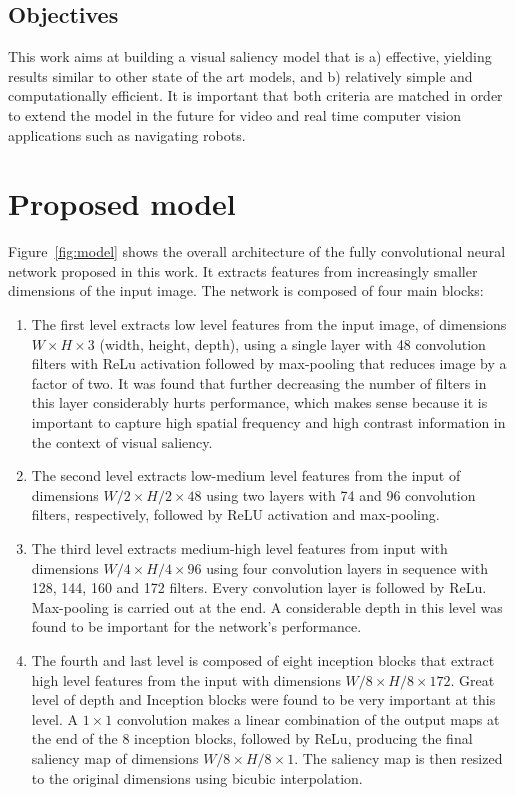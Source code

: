 \documentclass[10pt,twocolumn,letterpaper]{article}
\begin{document}
\subsection{Objectives}
This work aims at building a visual saliency model that is a) effective,
yielding results similar to other state of the art models,
and b) relatively simple and computationally efficient.
It is important that both criteria are matched in order to extend the
model in the future for video and real time computer vision applications
such as navigating robots.

\section{Proposed model}
Figure~\ref{fig:model} shows the overall architecture of the fully
convolutional neural network proposed in this work.
It extracts features from increasingly smaller dimensions of the
input image.
The network is composed of four main blocks:

\begin{enumerate}
    \item The first level extracts low level features from the input image, of
        dimensions $W\times H \times 3$ (width, height, depth), using
        a single layer with 48 convolution filters with ReLu activation
        followed by max-pooling that reduces image by a factor of two.
        It was found that further decreasing the number of filters in this
        layer considerably hurts performance, which makes sense because it is
        important to capture high spatial frequency and high contrast
        information in the context of visual saliency.
    \item The second level extracts low-medium level features from the
        input of dimensions $W/2 \times H/2 \times 48$ using two layers
        with 74 and 96 convolution filters, respectively, followed by ReLU
        activation and max-pooling.
    \item The third level extracts medium-high level features from input with
        dimensions $W/4 \times H/4 \times 96$ using four convolution layers
        in sequence with 128, 144, 160 and 172 filters.
        Every convolution layer is followed by ReLu.
        Max-pooling is carried out at the end.
        A considerable depth in this level was found to be important for
        the network's performance.
    \item The fourth and last level is composed of eight inception blocks
        that extract high level features from the input with
        dimensions $W/8 \times H/8 \times 172$.
        Great level of depth and Inception blocks were found to be very
        important at this level.
        A $1 \times 1$ convolution makes a linear combination of the output
        maps at the end of the 8 inception blocks, followed by ReLu, producing
        the final saliency map of dimensions $W/8 \times H/8 \times 1$.
        The saliency map is then resized to the original dimensions using
        bicubic interpolation.
\end{enumerate}
\end{document}
